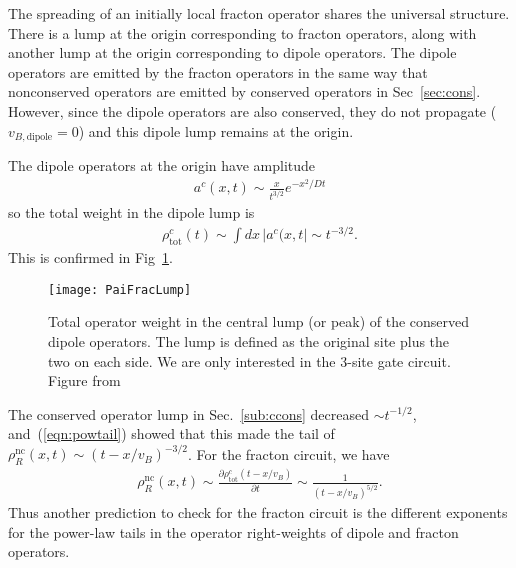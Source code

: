 \documentclass[a4paper,12pt]{article}
\newcommand{\pd}[2]{\frac{\partial #1}{\partial #2}}
\renewcommand{\th}[1]{\frac{1}{#1}}
\newcommand{\abs}[1]{\left| #1 \right|}
\newcommand{\nc}{\text{nc}}
\newcommand{\tot}{\text{tot}}
\begin{document}
The spreading of an initially local fracton operator shares the universal structure. There is a lump at the origin corresponding to fracton operators, along with another lump at the origin corresponding to dipole operators. The dipole operators are emitted by the fracton operators in the same way that nonconserved operators are emitted by conserved operators in Sec~\ref{sec:cons}. However, since the dipole operators are also conserved, they do not propagate ($v_{B, \text{dipole}}=0$) and this dipole lump remains at the origin.

The dipole operators at the origin have amplitude~\cite{PaiFracton}
\begin{align}
a^c(x,t) \sim \frac{x}{t^{3/2}}e^{-x^2/Dt}
\end{align}
so the total weight in the dipole lump is
\begin{align}
\rho^c_\tot(t) \sim \int dx\,\abs{a^c(x,t} \sim t^{-3/2}. \label{eqn:fraclump}
\end{align}
This is confirmed in Fig~\ref{fig:PaiFracLump}.
\begin{figure}
	\centering
	\texttt{[image: PaiFracLump]}
	\caption{Total operator weight in the central lump (or peak) of the conserved dipole operators. The lump is defined as the original site plus the two on each side. We are only interested in the 3-site gate circuit. Figure from~\cite{PaiFracton}}
	\label{fig:PaiFracLump}
\end{figure}
The conserved operator lump in Sec.~\ref{sub:ccons} decreased $\sim t^{-1/2}$, and~(\ref{eqn:powtail}) showed that this made the tail of $\rho_R^\nc(x,t)\sim (t-x/v_B)^{-3/2}$. For the fracton circuit, we have
\begin{align}
\rho_R^\nc(x,t)\sim\pd{\rho_\tot^c(t-x/v_B)}{t} \sim\th{(t-x/v_B)^{5/2}}. 
\end{align}
Thus another prediction to check for the fracton circuit is the different exponents for the power-law tails in the operator right-weights of dipole and fracton operators.
\end{document}
